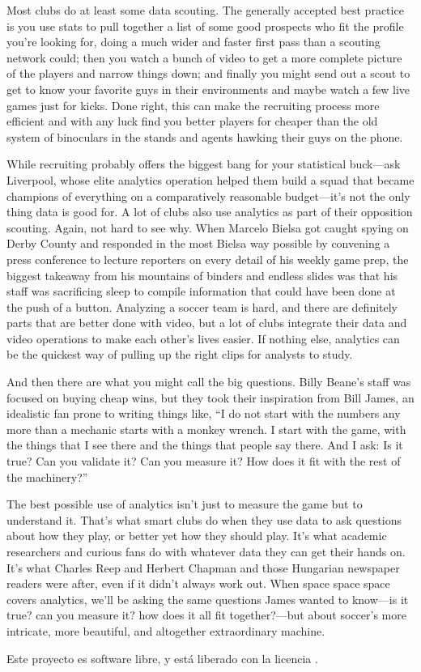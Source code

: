 Most clubs do at least some data scouting. The generally accepted best 
practice is you use stats to pull together a list of some good prospects 
who fit the profile you’re looking for, doing a much wider and faster 
first pass than a scouting network could; then you watch a bunch of video 
to get a more complete picture of the players and narrow things down; 
and finally you might send out a scout to get to know your favorite 
guys in their environments and maybe watch a few live games just for 
kicks. Done right, this can make the recruiting process more efficient 
and with any luck find you better players for cheaper than the old 
system of binoculars in the stands and agents hawking their guys 
on the phone. 

While recruiting probably offers the biggest bang for your 
statistical buck—ask Liverpool, whose elite analytics operation 
helped them build a squad that became champions of everything on 
a comparatively reasonable budget—it’s not the only thing data 
is good for. A lot of clubs also use analytics as part of their 
opposition scouting. Again, not hard to see why. When Marcelo 
Bielsa got caught spying on Derby County and responded in the 
most Bielsa way possible by convening a press conference to 
lecture reporters on every detail of his weekly game prep, 
the biggest takeaway from his mountains of binders and endless 
slides was that his staff was sacrificing sleep to compile 
information that could have been done at the push of a button. 
Analyzing a soccer team is hard, and there are definitely parts 
that are better done with video, but a lot of clubs integrate 
their data and video operations to make each other’s lives easier. 
If nothing else, analytics can be the quickest way of pulling up 
the right clips for analysts to study.

And then there are what you might call the big questions. Billy Beane’s 
staff was focused on buying cheap wins, but they took their inspiration 
from Bill James, an idealistic fan prone to writing things like, 
“I do not start with the numbers any more than a mechanic starts with 
a monkey wrench. I start with the game, with the things that I see 
there and the things that people say there. And I ask: Is it true? 
Can you validate it? Can you measure it? How does it fit with the 
rest of the machinery?”

The best possible use of analytics isn’t just to measure the game 
but to understand it. That’s what smart clubs do when they use data 
to ask questions about how they play, or better yet how they should 
play. It’s what academic researchers and curious fans do with whatever 
data they can get their hands on. It’s what Charles Reep and Herbert 
Chapman and those Hungarian newspaper readers were after, even if it 
didn’t always work out. When space space space covers analytics, 
we’ll be asking the same questions James wanted to know—is it true? 
can you measure it? how does it all fit together?—but about soccer’s 
more intricate, more beautiful, and altogether extraordinary machine. 



Este proyecto es software libre, y está liberado con la licencia \cite{gplv3}.
